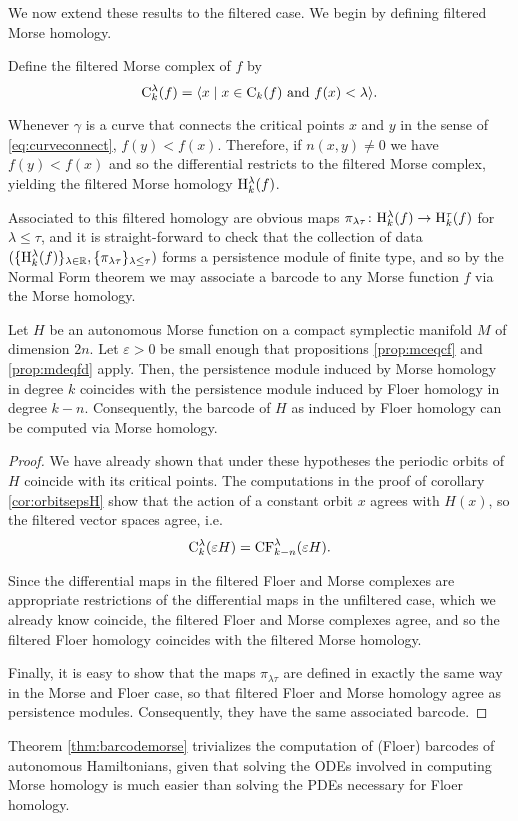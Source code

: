 We now extend these results to the filtered case. We begin by defining filtered Morse homology.

\begin{definition}
Define the filtered Morse complex of $f$ by
\begin{equation}
\mathrm{C}_k^\lambda(f) = \langle x \mid \text{$x \in \mathrm{C}_k(f)$ and $f(x) < \lambda$}\rangle.
\end{equation}

Whenever $\gamma$ is a curve that connects the critical points $x$ and $y$ in the sense of \eqref{eq:curveconnect}, $f(y) < f(x)$. Therefore, if $n(x,y) \neq 0$ we have $f(y) < f(x)$ and so the differential restricts to the filtered Morse complex, yielding the filtered Morse homology $\mathrm{H}_k^\lambda(f)$.

Associated to this filtered homology are obvious maps $\pi_{\lambda \tau} \colon \mathrm{H}_k^\lambda(f) \to \mathrm{H}_k^\tau(f)$ for $\lambda \leq \tau$, and it is straight-forward to check that the collection of data $(\{\mathrm{H}_k^\lambda(f)\}_{\lambda \in \mathbb{R}}, \{\pi_{\lambda\tau}\}_{\lambda \leq \tau})$ forms a persistence module of finite type, and so by the Normal Form theorem we may associate a barcode to any Morse function $f$ via the Morse homology.
\end{definition}

\begin{theorem}\label{thm:barcodemorse}
Let $H$ be an autonomous Morse function on a compact symplectic manifold $M$ of dimension $2n$. Let $\varepsilon > 0$ be small enough that propositions \ref{prop:mceqcf} and \ref{prop:mdeqfd} apply. Then, the persistence module induced by Morse homology in degree $k$ coincides with the persistence module induced by Floer homology in degree $k-n$. Consequently, the barcode of $H$ as induced by Floer homology can be computed via Morse homology.
\end{theorem}

\begin{proof}
We have already shown that under these hypotheses the periodic orbits of $H$ coincide with its critical points. The computations in the proof of corollary \ref{cor:orbitsepsH} show that the action of a constant orbit $x$ agrees with $H(x)$, so the filtered vector spaces agree, i.e.
\begin{equation}
\mathrm{C}_k^\lambda(\varepsilon H) = \mathrm{CF}_{k-n}^\lambda(\varepsilon H).
\end{equation}

Since the differential maps in the filtered Floer and Morse complexes are appropriate restrictions of the differential maps in the unfiltered case, which we already know coincide, the filtered Floer and Morse complexes agree, and so the filtered Floer homology coincides with the filtered Morse homology.

Finally, it is easy to show that the maps $\pi_{\lambda\tau}$ are defined in exactly the same way in the Morse and Floer case, so that filtered Floer and Morse homology agree as persistence modules. Consequently, they have the same associated barcode.
\end{proof}

Theorem \ref{thm:barcodemorse} trivializes the computation of (Floer) barcodes of autonomous Hamiltonians, given that solving the ODEs involved in computing Morse homology is much easier than solving the PDEs necessary for Floer homology.

